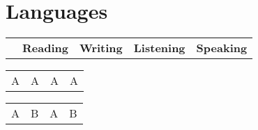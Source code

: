 %
%
%
%



\section{Languages}

\begin{tabular}
    {
        p{66mm} p{28mm} p{28mm} p{28mm} p{28mm}
    }
    \textbf{} & \textbf{Reading} & \textbf{Writing} & \textbf{Listening} & \textbf{Speaking}
\end{tabular}

    {
	    \begin{tabular}
	        {
	            p{28mm} p{28mm} p{28mm} p{28mm}
	        }
	        A & A & A & A
	    \end{tabular}
	}

    {
	    \begin{tabular}
	        {
	            p{28mm} p{28mm} p{28mm} p{28mm}
            }
		    A & B & A & B
	    \end{tabular}
    }
